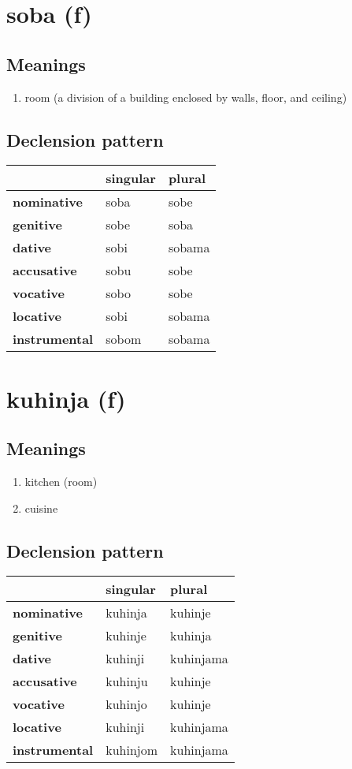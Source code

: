 \filbreak
\section{soba (f)}
\subsection*{Meanings}
\begin{enumerate}
\item room (a division of a building enclosed by walls, floor, and ceiling)
\end{enumerate}
\subsection*{Declension pattern}
\begin{tabularx}{\linewidth}{Xll}
\toprule
{} & singular &  plural \\
\midrule
\textbf{nominative  } &     soba &    sobe \\
\textbf{genitive    } &     sobe &    soba \\
\textbf{dative      } &     sobi &  sobama \\
\textbf{accusative  } &     sobu &    sobe \\
\textbf{vocative    } &     sobo &    sobe \\
\textbf{locative    } &     sobi &  sobama \\
\textbf{instrumental} &    sobom &  sobama \\
\bottomrule
\end{tabularx}

\filbreak
\section{kuhinja (f)}
\subsection*{Meanings}
\begin{enumerate}
\item kitchen (room)
\item cuisine
\end{enumerate}
\subsection*{Declension pattern}
\begin{tabularx}{\linewidth}{Xll}
\toprule
{} &  singular &     plural \\
\midrule
\textbf{nominative  } &   kuhinja &    kuhinje \\
\textbf{genitive    } &   kuhinje &    kuhinja \\
\textbf{dative      } &   kuhinji &  kuhinjama \\
\textbf{accusative  } &   kuhinju &    kuhinje \\
\textbf{vocative    } &   kuhinjo &    kuhinje \\
\textbf{locative    } &   kuhinji &  kuhinjama \\
\textbf{instrumental} &  kuhinjom &  kuhinjama \\
\bottomrule
\end{tabularx}

